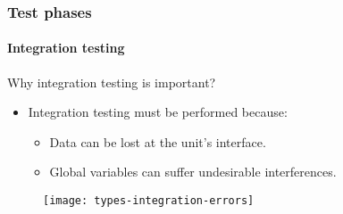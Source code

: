 \begin{frame}
\frametitle{Test phases}
\framesubtitle{Integration testing}

\begin{block:fact}{Why integration testing is important?}
\begin{itemize}
	\item Integration testing must be performed because:
	\begin{itemize}
		\item Data can be lost at the unit's interface.

		\item Global variables can suffer undesirable interferences.
	\end{itemize}
\end{itemize}
\end{block:fact}

\begin{figure}
    \centering
    \texttt{[image: types-integration-errors]}
\end{figure}
\end{frame}


